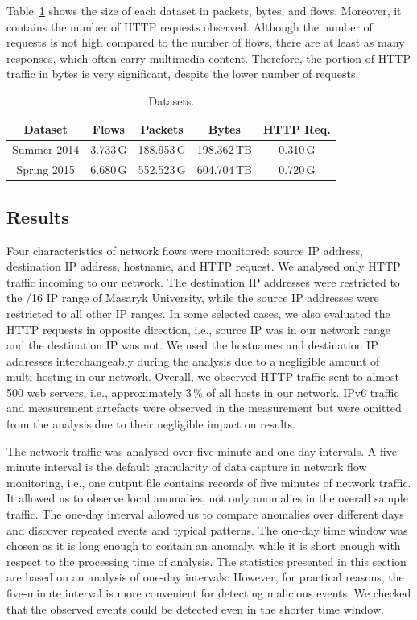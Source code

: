 Table~\ref{tab:httpsecurity-data-sets} shows the size of each dataset in packets, bytes, and flows. Moreover, it contains the number of HTTP requests observed. Although the number of requests is not high compared to the number of flows, there are at least as many responses, which often carry multimedia content. Therefore, the portion of HTTP traffic in bytes is very significant, despite the lower number of requests.

\begin{table}[ht]
\centering
\begin{tabular}{| c | c | c | c | c |} \hline
Dataset &  Flows & Packets & Bytes & HTTP Req.\\ \hline
Summer 2014 & 3.733\,G & 188.953\,G & 198.362\,TB & 0.310\,G \\ \hline
Spring 2015 & 6.680\,G & 552.523\,G & 604.704\,TB & 0.720\,G \\ \hline
\end{tabular}
\caption{Datasets.}
\label{tab:httpsecurity-data-sets}
\end{table}


\subsection{Results}\label{subsec:httpsecurity-results}

Four characteristics of network flows were monitored: source IP address, destination IP address, hostname, and HTTP request. We analysed only HTTP traffic incoming to our network. The destination IP addresses were restricted to the /16 IP range of Masaryk University, while the source IP addresses were restricted to all other IP ranges. In some selected cases, we also evaluated the HTTP requests in opposite direction, i.e., source IP was in our network range and the destination IP was not. We used the hostnames and destination IP addresses interchangeably during the analysis due to a negligible amount of multi-hosting in our network. Overall, we observed HTTP traffic sent to almost 500 web servers, i.e., approximately 3\,\% of all hosts in our network. IPv6 traffic and measurement artefacts were observed in the measurement but were omitted from the analysis due to their negligible impact on results.

The network traffic was analysed over five-minute and one-day intervals. A five-minute interval is the default granularity of data capture in network flow monitoring, i.e., one output file contains records of five minutes of network traffic. It allowed us to observe local anomalies, not only anomalies in the overall sample traffic. The one-day interval allowed us to compare anomalies over different days and discover repeated events and typical patterns. The one-day time window was chosen as it is long enough to contain an anomaly, while it is short enough with respect to the processing time of analysis. The statistics presented in this section are based on an analysis of one-day intervals. However, for practical reasons, the five-minute interval is more convenient for detecting malicious events. We checked that the observed events could be detected even in the shorter time window.

